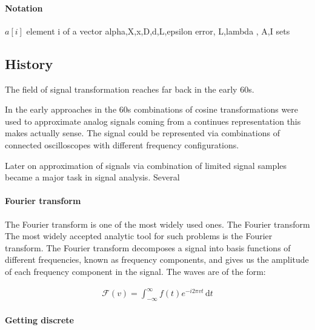 
\paragraph{Notation}
$a[i]$ element i of a vector
alpha,X,x,D,d,L,epsilon error, L,lambda , A,I sets

\subsection{History}
\label{sec:history}
The field of signal transformation reaches far back in the early 60s.
\cite{Rubinstein2010}

In the early approaches in the 60s combinations of cosine
transformations were used to approximate analog signals coming from a continues
representation this makes actually sense. The signal could be represented via
combinations of connected oscilloscopes with different frequency
configurations. 

Later on approximation of signals via combination of limited signal samples
became a major task in signal analysis. Several 

\paragraph{Fourier transform}
The Fourier transform is one of the most widely used ones.
The Fourier transform 
The most widely accepted analytic tool for such problems is the Fourier
transform. The Fourier transform decomposes a signal into basis functions of
different frequencies, known as frequency components, and gives us the amplitude
of each frequency component in the signal. The waves are of the form:

\begin{align*}
\mathcal{F}\left(v\right) = \int_{-\infty}^{\infty} \! f(t)e^{-i2\pi vt} \,
\mathrm{d}t
\end{align*}

\paragraph{Getting discrete}

